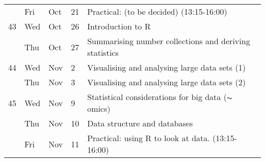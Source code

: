 \begin{tabu}{ l l l l| l}
  \rowfont{\color{blue!75}}
  & Fri & Oct & 21 & Practical: (to be decided) (13:15-16:00) \\
  43 & Wed & Oct & 26 & Introduction to R \\
  & Thu & Oct & 27 & Summarising number collections and deriving statistics \\
  44 & Wed & Nov & 2 & Visualising and analysing large data sets (1) \\
  & Thu & Nov & 3 & Visualising and analysing large data sets (2) \\
  45 & Wed & Nov & 9 & Statistical considerations for big data ($\thicksim$ omics) \\
  & Thu & Nov & 10 & Data structure and databases \\
  \rowfont{\color{blue!75}}
  & Fri & Nov & 11 & Practical: using R to look at data. (13:15-16:00) \\
\end{tabu}
